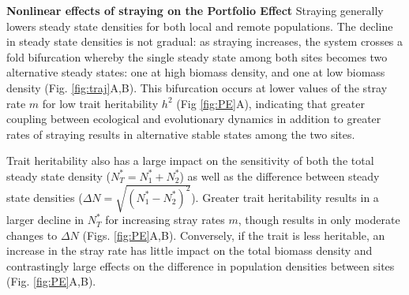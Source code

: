 \documentclass[twocolumn,preprintnumbers,amsmath,amssymb,superscriptaddress]{revtex4}
\begin{document}



{\bf Nonlinear effects of straying on the Portfolio Effect} Straying generally lowers steady state densities for both local and remote populations. %
The decline in steady state densities is not gradual: as straying increases, the system crosses a fold bifurcation whereby the single steady state among both sites becomes two alternative steady states: one at high biomass density, and one at low biomass density (Fig. \ref{fig:traj}A,B).
This bifurcation occurs at lower values of the stray rate $m$ for low trait heritability $h^2$ (Fig \ref{fig:PE}A), indicating that greater coupling between ecological and evolutionary dynamics in addition to greater rates of straying results in alternative stable states among the two sites.

Trait heritability also has a large impact on the sensitivity of both the total steady state density ($N^*_T=N^*_1+N^*_2$) as well as the difference between steady state densities ($\Delta N=\sqrt{(N^*_1-N^*_2)^2}$).
Greater trait heritability results in a larger decline in $N_T^*$ for increasing stray rates $m$, though results in only moderate changes to $\Delta N$ (Figs. \ref{fig:PE}A,B).
Conversely, if the trait is less heritable, an increase in the stray rate has little impact on the total biomass density and contrastingly large effects on the difference in population densities between sites (Fig. \ref{fig:PE}A,B).
\end{document}
